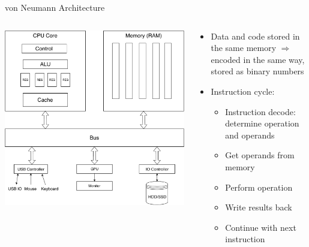 
\begin{frame}{von Neumann Architecture}
  \begin{columns}
    \begin{column}{0.5\textwidth}
      \includegraphics[width=\textwidth]{pic/VNeumann}
    \end{column}
    \begin{column}{0.5\textwidth}
  \begin{itemize}
  \item Data and code stored in the same memory $\Rightarrow$ encoded in the same way, stored as binary numbers
  \item Instruction cycle:
    \begin{itemize}
    \item
      Instruction decode: determine operation and operands
    \item
      Get operands from memory
    \item
      Perform operation
    \item
      Write results back
    \item
      Continue with next instruction
    \end{itemize}
  \end{itemize}

      
    \end{column}
  \end{columns}
  \begin{center}
  \end{center}

\end{frame}

